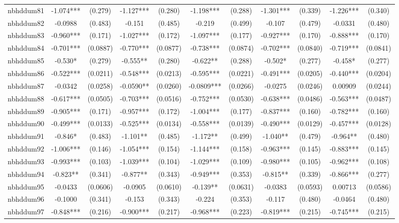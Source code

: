 \documentclass[]{article}
\begin{document}
\begin{tabular}{lcccccccccc}
nbhddum81 & -1.074*** & (0.279) & -1.127*** & (0.280) & -1.198*** & (0.288) & -1.301*** & (0.339) & -1.226*** & (0.340) \\
nbhddum82 & -0.0988 & (0.483) & -0.151 & (0.485) & -0.219 & (0.499) & -0.107 & (0.479) & -0.0331 & (0.480) \\
nbhddum83 & -0.960*** & (0.171) & -1.027*** & (0.172) & -1.097*** & (0.177) & -0.927*** & (0.170) & -0.888*** & (0.170) \\
nbhddum84 & -0.701*** & (0.0887) & -0.770*** & (0.0877) & -0.738*** & (0.0874) & -0.702*** & (0.0840) & -0.719*** & (0.0841) \\
nbhddum85 & -0.530* & (0.279) & -0.555** & (0.280) & -0.622** & (0.288) & -0.502* & (0.277) & -0.458* & (0.277) \\
nbhddum86 & -0.522*** & (0.0211) & -0.548*** & (0.0213) & -0.595*** & (0.0221) & -0.491*** & (0.0205) & -0.440*** & (0.0204) \\
nbhddum87 & -0.0342 & (0.0258) & -0.0590** & (0.0260) & -0.0809*** & (0.0266) & -0.0275 & (0.0246) & 0.00909 & (0.0244) \\
nbhddum88 & -0.617*** & (0.0505) & -0.703*** & (0.0516) & -0.752*** & (0.0530) & -0.638*** & (0.0486) & -0.563*** & (0.0487) \\
nbhddum89 & -0.905*** & (0.171) & -0.957*** & (0.172) & -1.004*** & (0.177) & -0.837*** & (0.160) & -0.782*** & (0.160) \\
nbhddum90 & -0.499*** & (0.0133) & -0.525*** & (0.0134) & -0.558*** & (0.0139) & -0.490*** & (0.0129) & -0.457*** & (0.0128) \\
nbhddum91 & -0.846* & (0.483) & -1.101** & (0.485) & -1.172** & (0.499) & -1.040** & (0.479) & -0.964** & (0.480) \\
nbhddum92 & -1.006*** & (0.146) & -1.054*** & (0.154) & -1.144*** & (0.158) & -0.963*** & (0.145) & -0.883*** & (0.145) \\
nbhddum93 & -0.993*** & (0.103) & -1.039*** & (0.104) & -1.029*** & (0.109) & -0.980*** & (0.105) & -0.962*** & (0.108) \\
nbhddum94 & -0.823** & (0.341) & -0.877** & (0.343) & -0.949*** & (0.353) & -0.815** & (0.339) & -0.866*** & (0.277) \\
nbhddum95 & -0.0433 & (0.0606) & -0.0905 & (0.0610) & -0.139** & (0.0631) & -0.0383 & (0.0593) & 0.00713 & (0.0586) \\
nbhddum96 & -0.1000 & (0.341) & -0.153 & (0.343) & -0.224 & (0.353) & -0.117 & (0.480) & -0.0464 & (0.480) \\
nbhddum97 & -0.848*** & (0.216) & -0.900*** & (0.217) & -0.968*** & (0.223) & -0.819*** & (0.215) & -0.745*** & (0.215) \\

\end{tabular}
\end{document}
